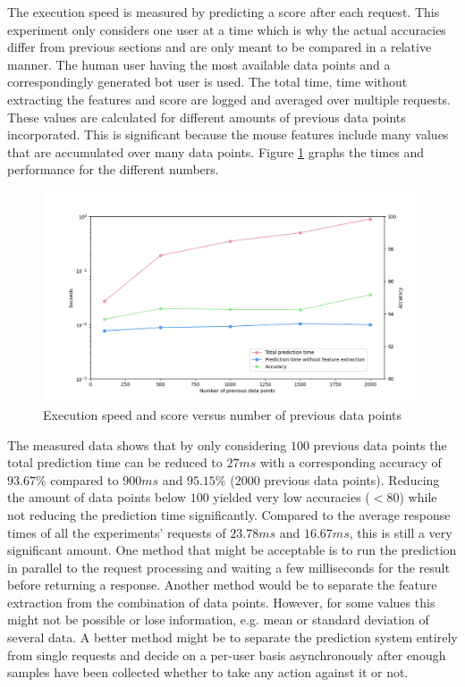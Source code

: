 \documentclass[
    fontsize=12pt,
    headings=small,
    parskip=half,           %
    bibliography=totoc,
    numbers=noenddot,       %
    open=any,               %
    final,                   %
    table
]{scrreprt}
\begin{document}
The execution speed is measured by predicting a score after each request. This experiment only considers one user at a time which is why the actual accuracies differ from previous sections and are only meant to be compared in a relative manner. The human user having the most available data points and a correspondingly generated bot user is used. The total time, time without extracting the features and score are logged and averaged over multiple requests. These values are calculated for different amounts of previous data points incorporated. This is significant because the mouse features include many values that are accumulated over many data points. Figure \ref{fig:speed_per_dp_count} graphs the times and performance for the different numbers.

\begin{figure}[H]
    \includegraphics[width=\textwidth]{figures/speed_per_dp_count.png}
    \caption{Execution speed and score versus number of previous data points}
    \label{fig:speed_per_dp_count}
\end{figure}

The measured data shows that by only considering $100$ previous data points the total prediction time can be reduced to $27ms$ with a corresponding accuracy of $93.67\%$ compared to $900ms$ and $95.15\%$ ($2000$ previous data points). Reducing the amount of data points below $100$ yielded very low accuracies ($<80$) while not reducing the prediction time significantly. Compared to the average response times of all the experiments' requests of $23.78ms$ and $16.67ms$, this is still a very significant amount. One method that might be acceptable is to run the prediction in parallel to the request processing and waiting a few milliseconds for the result before returning a response. Another method would be to separate the feature extraction from the combination of data points. However, for some values this might not be possible or lose information, e.g. mean or standard deviation of several data.
A better method might be to separate the prediction system entirely from single requests and decide on a per-user basis asynchronously after enough samples have been collected whether to take any action against it or not.
\end{document}
